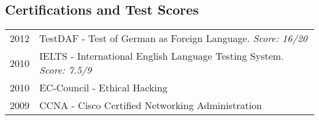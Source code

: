 \subsection{Certifications and Test Scores}
\begin{longtable}
	{r|p{13cm}}
	\textsc{2012} & TestDAF - Test of German as Foreign Language. \emph{Score: 16/20} \\
	\textsc{2010} & IELTS - International English Language Testing System. \emph{Score: 7.5/9} \\
	\textsc{2010} & EC-Council - Ethical Hacking\\
	\textsc{2009} & CCNA - Cisco Certified Networking Administration\\
\end{longtable}
